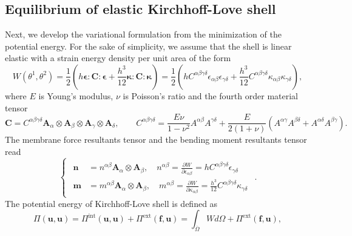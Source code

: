 \subsection{Equilibrium of elastic Kirchhoff-Love shell}\label{sec:equilibrium}

Next, we develop the variational formulation from the minimization of the potential energy. For the sake of simplicity, we assume that the shell is linear elastic with a strain energy density per unit area of the form~\cite{chapelle2010finite}
\begin{equation}
	\label{eq:strain_energy_density}
	W(\theta^1,\theta^2) = \frac{1}{2}\left( h \mathbf{\epsilon}\colon \mathbf{C}\colon \mathbf{\epsilon} + \frac{h^3}{12} \mathbf{\kappa }\colon \mathbf{C}\colon \mathbf{\kappa } \right)= \frac{1}{2}\left( hC^{\alpha\beta\gamma\delta}\epsilon_{\alpha\beta}\epsilon_{\gamma\delta}+\frac{h^3}{12}C^{\alpha\beta\gamma\delta}\kappa_{\alpha\beta}\kappa_{\gamma\delta} \right),
\end{equation}
where $E$ is Young's modulus, $\nu$ is Poisson's ratio and the fourth order material tensor
\begin{equation}
	\label{eq:material_tensor}
	\mathbf{C} = C^{\alpha\beta\gamma\delta} \mathbf{A}_\alpha\otimes\mathbf{A}_\beta\otimes\mathbf{A}_\gamma\otimes\mathbf{A}_\delta,\qquad C^{\alpha\beta\gamma\delta} = \frac{E\nu}{1-\nu^2} A^{\alpha\beta}A^{\gamma\delta}+\frac{E}{2(1+\nu)}\left( A^{\alpha\gamma}A^{\beta\delta}+A^{\alpha\delta}A^{\beta\gamma} \right).
\end{equation}
The membrane force resultants tensor and the bending moment resultants tensor read
\begin{equation}
	\label{eq:stress_and_moment}
	\begin{cases}
		\begin{aligned}
			\mathbf{n} & = n^{\alpha\beta}\mathbf{A}_\alpha\otimes\mathbf{A}_\beta,\quad n^{\alpha\beta} =\frac{\partial W}{\partial \epsilon_{\alpha\beta}} = hC^{\alpha\beta\gamma\delta}\epsilon_{\gamma\delta}         \\
			\mathbf{m} & = m^{\alpha\beta}\mathbf{A}_\alpha\otimes\mathbf{A}_\beta,\quad m^{\alpha\beta} =\frac{\partial W}{\partial \kappa_{\alpha\beta}} =\frac{h^3}{12}C^{\alpha\beta\gamma\delta}\kappa_{\gamma\delta}
		\end{aligned}
	\end{cases}.
\end{equation}
The potential energy of Kirchhoff-Love shell is defined as
\begin{equation}
	\label{eq:potential_energy}
	\Pi(\mathbf{u},\mathbf{u}) = \Pi^\text{int}(\mathbf{u},\mathbf{u})+\Pi^\text{ext}(\mathbf{f}, \mathbf{u}) = \int_{\overline{\Omega}}W d\Omega+\Pi^\text{ext}(\mathbf{f}, \mathbf{u}),
\end{equation}
